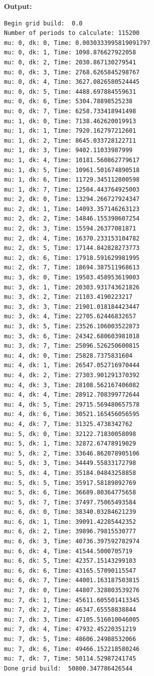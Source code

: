 \documentclass{article}
\begin{document}
\textbf{Output:}\begin{verbatim}
Begin grid build:  0.0
Number of periods to calculate: 115200
mu: 0, dk: 0, Time: 0.0030333995819091797
mu: 0, dk: 1, Time: 1098.876627922058
mu: 0, dk: 2, Time: 2030.867130279541
mu: 0, dk: 3, Time: 2768.6265845298767
mu: 0, dk: 4, Time: 3627.0826580524445
mu: 0, dk: 5, Time: 4488.697884559631
mu: 0, dk: 6, Time: 5304.78898525238
mu: 0, dk: 7, Time: 6258.733418941498
mu: 1, dk: 0, Time: 7138.462620019913
mu: 1, dk: 1, Time: 7920.162797212601
mu: 1, dk: 2, Time: 8645.033728122711
mu: 1, dk: 3, Time: 9402.11033987999
mu: 1, dk: 4, Time: 10181.560862779617
mu: 1, dk: 5, Time: 10961.501674890518
mu: 1, dk: 6, Time: 11729.345112800598
mu: 1, dk: 7, Time: 12504.443764925003
mu: 2, dk: 0, Time: 13294.266727924347
mu: 2, dk: 1, Time: 14093.357146263123
mu: 2, dk: 2, Time: 14846.155398607254
mu: 2, dk: 3, Time: 15594.26377081871
mu: 2, dk: 4, Time: 16370.233153104782
mu: 2, dk: 5, Time: 17144.842828273773
mu: 2, dk: 6, Time: 17918.591629981995
mu: 2, dk: 7, Time: 18694.387511968613
mu: 3, dk: 0, Time: 19503.458953619003
mu: 3, dk: 1, Time: 20303.931743621826
mu: 3, dk: 2, Time: 21103.4190223217
mu: 3, dk: 3, Time: 21901.018184423447
mu: 3, dk: 4, Time: 22705.62446832657
mu: 3, dk: 5, Time: 23526.106003522873
mu: 3, dk: 6, Time: 24342.680603981018
mu: 3, dk: 7, Time: 25096.526250600815
mu: 4, dk: 0, Time: 25828.7375831604
mu: 4, dk: 1, Time: 26547.052716970444
mu: 4, dk: 2, Time: 27303.901291370392
mu: 4, dk: 3, Time: 28108.562167406082
mu: 4, dk: 4, Time: 28912.708399772644
mu: 4, dk: 5, Time: 29715.569480657578
mu: 4, dk: 6, Time: 30521.165456056595
mu: 4, dk: 7, Time: 31325.4738342762
mu: 5, dk: 0, Time: 32122.71830058098
mu: 5, dk: 1, Time: 32872.67478919029
mu: 5, dk: 2, Time: 33646.862078905106
mu: 5, dk: 3, Time: 34449.55833172798
mu: 5, dk: 4, Time: 35184.04843258858
mu: 5, dk: 5, Time: 35917.58189892769
mu: 5, dk: 6, Time: 36689.80364775658
mu: 5, dk: 7, Time: 37497.75065493584
mu: 6, dk: 0, Time: 38340.03284621239
mu: 6, dk: 1, Time: 39091.42285442352
mu: 6, dk: 2, Time: 39896.79815530777
mu: 6, dk: 3, Time: 40736.397592782974
mu: 6, dk: 4, Time: 41544.5000705719
mu: 6, dk: 5, Time: 42357.15143299103
mu: 6, dk: 6, Time: 43165.57090115547
mu: 6, dk: 7, Time: 44001.163187503815
mu: 7, dk: 0, Time: 44807.328803539276
mu: 7, dk: 1, Time: 45611.605501413345
mu: 7, dk: 2, Time: 46347.65558838844
mu: 7, dk: 3, Time: 47105.516010046005
mu: 7, dk: 4, Time: 47932.45220351219
mu: 7, dk: 5, Time: 48606.24988532066
mu: 7, dk: 6, Time: 49466.152218580246
mu: 7, dk: 7, Time: 50114.52987241745
Done grid build:  50800.347786426544

\end{verbatim}
\end{document}
